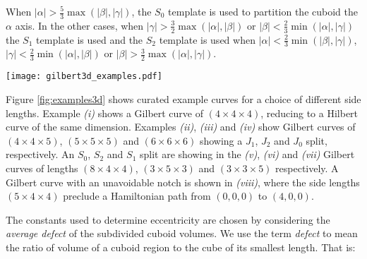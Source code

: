 When $|\alpha| > \frac{5}{3} \max(|\beta|, |\gamma|)$, the $S_0$ template is used to partition the cuboid the $\alpha$ axis.
In the other cases, when $|\gamma| > \frac{3}{2} \max(|\alpha|, |\beta|)$ or $|\beta| < \frac{2}{3} \min(|\alpha|, |\gamma|)$ the $S_1$
template is used and the $S_2$ template is used when
$|\alpha| < \frac{2}{3} \min(|\beta|, |\gamma|)$,
$|\gamma| < \frac{2}{3} \min(|\alpha|, |\beta|)$ or
$|\beta| > \frac{3}{2} \max(|\alpha|, |\gamma|)$.

\begin{figure*}[ht]
  \centering
  \texttt{[image: gilbert3d\_examples.pdf]}
  \caption{ Examples
  of 3D Gilbert curves highlighting different aspects of the algorithm.
  i) $(4 \times 4 \times 4)$, equivalent to the Hilbert curve of the same side lengths.
  ii) $(4 \times 4 \times 5)$ show a $J_1$ split subdivision scheme.
  iii) $(5 \times 5 \times 5)$, shows a $J_2$ split subdivision scheme.
  iv) $(6 \times 6 \times 6)$, shows a $J_0$ subdivision scheme.
  v) $(8 \times 4 \times 4)$, shows an $S_0$ subdivision scheme, splitting on the $\alpha$ dimension.
  vi) $(3 \times 5 \times 3)$, shows an $S_2$ subdivision scheme.
  vii) $(3 \times 3 \times 5)$, shows an $S_1$ subdivision scheme.
  viii) $(5 \times 4 \times 4)$, shows an example of a configuration where a diagonal move (\textit{notch}) is formed
  as there's no Hamiltonian path possible for the given endpoints.
  }
  \label{fig:examples3d}
\end{figure*}


Figure \ref{fig:examples3d} shows curated example curves for a choice of different side lengths.
Example \textit{(i)} shows a Gilbert curve of $(4 \times 4 \times 4)$, reducing to a Hilbert curve of the same dimension.
Examples \textit{(ii)}, \textit{(iii)} and \textit{(iv)} show Gilbert curves of $(4 \times 4 \times 5)$, $(5 \times 5 \times 5)$
and $(6 \times 6 \times 6)$ showing a $J_1$, $J_2$ and $J_0$ split, respectively.
An $S_0$, $S_2$ and $S_1$ split are showing in the \textit{(v)}, \textit{(vi)} and \textit{(vii)} Gilbert curves of
lengths $(8 \times 4 \times 4)$, $(3 \times 5 \times 3)$ and $(3 \times 3 \times 5)$ respectively.
A Gilbert curve with an unavoidable notch is 
shown in \textit{(viii)}, where the side lengths $(5 \times 4 \times 4)$ preclude a Hamiltonian path from $(0,0,0)$ to $(4,0,0)$.


The constants used to determine eccentricity are chosen by considering the \textit{average defect} of the subdivided cuboid volumes.
We use the term \textit{defect} to mean the ratio of volume of a cuboid region to the cube of its smallest length.
That is:

